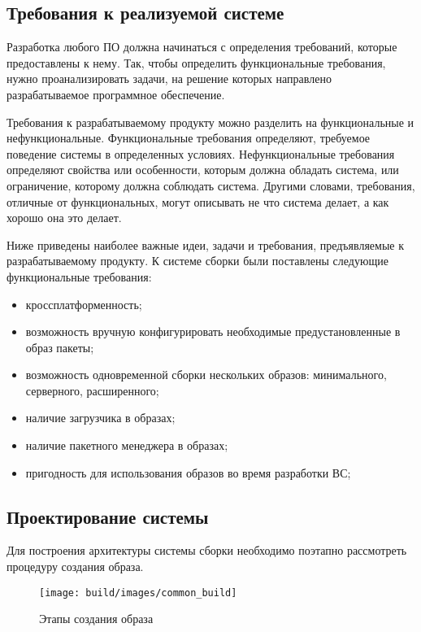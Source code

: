 \subsection{Требования к реализуемой системе}
\label{subsec:build-system-requirements}
Разработка любого ПО должна начинаться с определения требований, которые предоставлены к нему\cite{REQUIREMENTS}.
Так, чтобы определить функциональные требования, нужно проанализировать задачи, на решение которых направлено разрабатываемое программное обеспечение.

Требования к разрабатываемому продукту можно разделить на функциональные и нефункциональные\cite{REQUIREMENTS}.
Функциональные требования определяют, требуемое поведение системы в определенных условиях.
Нефункциональные требования определяют свойства или особенности, которым должна обладать система, или ограничение, которому должна соблюдать система.
Другими словами, требования, отличные от функциональных, могут описывать не что система делает, а как хорошо она это делает\cite{REQUIREMENTS}.

Ниже приведены наиболее важные идеи, задачи и требования, предъявляемые к разрабатываемому продукту.
К системе сборки были поставлены следующие функциональные требования:
\begin{itemize}
  \item кроссплатформенность;
  \item возможность вручную конфигурировать необходимые предустановленные в образ пакеты;
  \item возможность одновременной сборки нескольких образов: минимального, серверного, расширенного;
  \item наличие загрузчика в образах;
  \item наличие пакетного менеджера в образах;
  \item пригодность для использования образов во время разработки ВС;
\end{itemize}
\newpage

\newpage
\subsection{Проектирование системы}
Для построения архитектуры системы сборки необходимо поэтапно рассмотреть процедуру создания образа.

\begin{figure}[h!]
  \centering
  \setlength{\fboxsep}{5pt}
  \texttt{[image: build/images/common\_build]}
  \caption{Этапы создания образа}\label{fig: common_build}
\end{figure}

